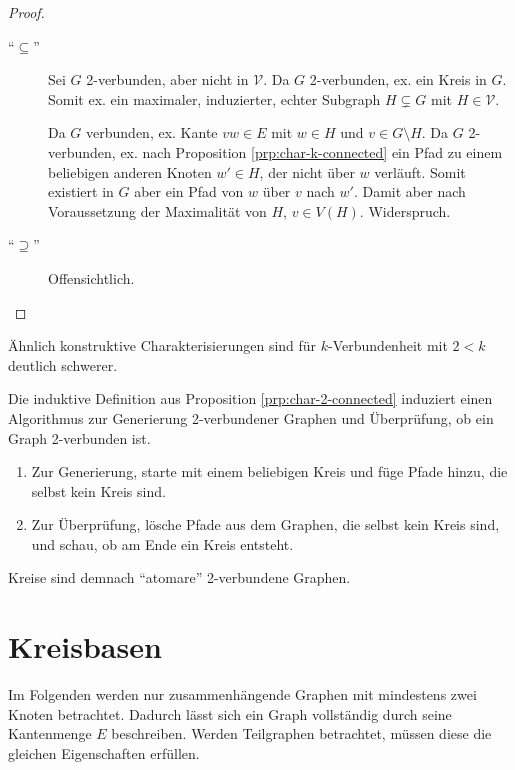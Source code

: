 \begin{proof}~\par
    \begin{description}
        \item[``$ \subseteq $''] Sei $ G $ 2-verbunden, aber nicht in $ \mathcal{V} $.
        Da $ G $ 2-verbunden, ex. ein Kreis in $ G $.
        Somit ex. ein maximaler, induzierter, echter Subgraph $ H \subsetneq G $ mit $ H \in \mathcal{V} $.

        Da $ G $ verbunden, ex. Kante $ vw \in E $ mit $ w \in H $ und $ v \in G \setminus H $.
        Da $ G $ 2-verbunden, ex. nach Proposition \ref{prp:char-k-connected} ein Pfad zu einem beliebigen anderen Knoten $ w' \in H $, der nicht über $ w $ verläuft.
        Somit existiert in $ G $ aber ein Pfad von $ w $ über $ v $ nach $ w' $.
        Damit aber nach Voraussetzung der Maximalität von $ H $, $ v \in V(H) $.
        Widerspruch.
        \item[``$ \supseteq $''] Offensichtlich.
    \end{description}
\end{proof}

\begin{remark}
    Ähnlich konstruktive Charakterisierungen sind für $ k $-Verbundenheit mit $ 2 < k $ deutlich schwerer.
\end{remark}

\begin{observation}
    Die induktive Definition aus Proposition \ref{prp:char-2-connected} induziert einen Algorithmus zur Generierung 2-verbundener Graphen und Überprüfung, ob ein Graph 2-verbunden ist.
    \begin{enumerate}
        \item Zur Generierung, starte mit einem beliebigen Kreis und füge Pfade hinzu, die selbst kein Kreis sind.
        \item Zur Überprüfung, lösche Pfade aus dem Graphen, die selbst kein Kreis sind, und schau, ob am Ende ein Kreis entsteht.
    \end{enumerate}

    Kreise sind demnach ``atomare'' 2-verbundene Graphen.
\end{observation}

\section{Kreisbasen}

Im Folgenden werden nur zusammenhängende Graphen mit mindestens zwei Knoten betrachtet.
Dadurch lässt sich ein Graph vollständig durch seine Kantenmenge $ E $ beschreiben.
Werden Teilgraphen betrachtet, müssen diese die gleichen Eigenschaften erfüllen.


